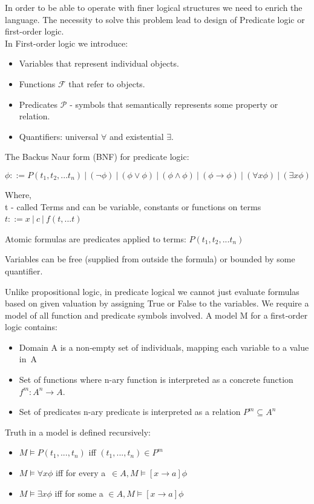In order to be able to operate with finer logical structures we need to enrich the language.
The necessity to solve this problem lead to design of Predicate logic or first-order logic.\\
In First-order logic we introduce:\\
\begin{itemize}
    
    \item Variables that represent individual objects.
    \item Functions $\mathcal{F}$ that refer to objects.
    \item Predicates $\mathcal{P}$ - symbols that semantically represents some property or relation.
    \item Quantifiers: universal $\forall$ and existential $\exists$.
\end{itemize}


The Backus Naur form (BNF) for predicate logic:

\[ \phi ::= P(t_1,t_2,...t_n)\ |\ (\neg \phi)\ |\ (\phi \lor \phi)\  |\ (\phi \land \phi)\   |\ (\phi \rightarrow \phi)\ |\ (\forall x \phi)\ |\ (\exists x \phi)\ \]

Where,\\ 
t - called Terms and can be variable, constants or functions on terms  $t ::= x\ |\ c\ |\ f(t,...t)$ 

Atomic formulas are predicates applied to terms: $P(t_1,t_2,...t_n) $

Variables can be free (supplied from outside the formula) or bounded by some quantifier.

Unlike propositional logic, in predicate logical we cannot just evaluate formulas based on given valuation by assigning True or False to the variables.  
We require a model of all function and predicate symbols involved.
A model M for a first‑order logic contains: 
\begin{itemize}
    \item Domain A is a non‑empty set of individuals, mapping each variable to a value in A
    \item Set of functions where n-ary function is interpreted as a concrete function $f^m : A^n \rightarrow A$.
    \item Set of predicates n-ary predicate is interpreted as a relation $P^m \subseteq A^n $ 
\end{itemize}

Truth in a model is defined recursively:

\begin{itemize}
    \item $ M \models P(t_1,...,t_n)$ iff $(t_1,...,t_n) \in P^m $
    \item $M\models\forall x\phi $ iff for every a $ \in A, M \models [x \rightarrow a ] \phi $
    \item $M\models\exists x\phi $ iff for some a $ \in A, M \models [x \rightarrow a ] \phi $
\end{itemize}

